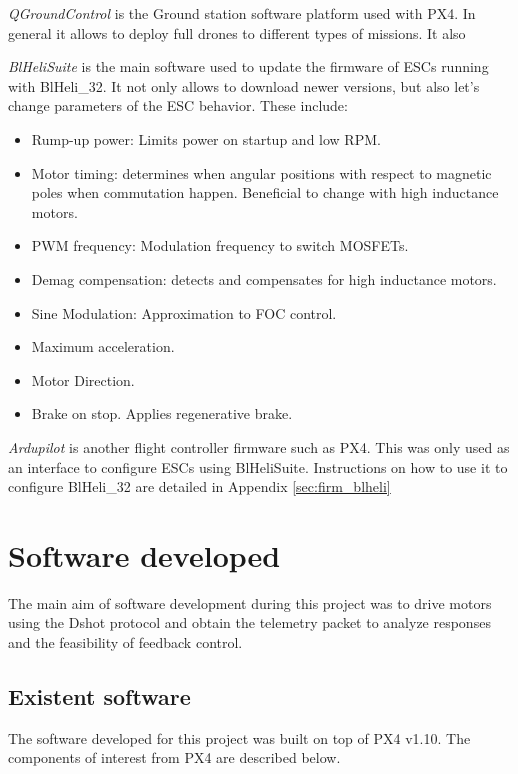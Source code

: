 \textit{QGroundControl} is the Ground station software platform used with PX4. In general it allows to deploy full drones to different types of missions. It also 
\newline

\textit{BlHeliSuite} is the main software used to update the firmware of ESCs running with BlHeli\_32. It not only allows to download newer versions, but also let's change parameters of the ESC behavior. These include:

\begin{itemize}
	\item Rump-up power: Limits power on startup and low RPM.
	\item Motor timing: determines when angular positions with respect to magnetic poles when commutation happen. Beneficial to change with high inductance motors.
	\item PWM frequency: Modulation frequency to switch MOSFETs.
	\item Demag compensation: detects and compensates for high inductance motors.
	\item Sine Modulation: Approximation to FOC control.
	\item Maximum acceleration.
	\item Motor Direction.
	\item Brake on stop. Applies regenerative brake.
\end{itemize}

\textit{Ardupilot} is another flight controller firmware such as PX4. This was only used as an interface to configure ESCs using BlHeliSuite. Instructions on how to use it to configure BlHeli\_32 are detailed in Appendix \ref{sec:firm_blheli}
\newline

\section{Software developed}
The main aim of software development during this project was to drive motors using the Dshot protocol and obtain the telemetry packet to analyze responses and the feasibility of feedback control.

\subsection{Existent software}
The software developed for this project was built on top of PX4 v1.10. The components of interest from PX4 are described below.
\newline

